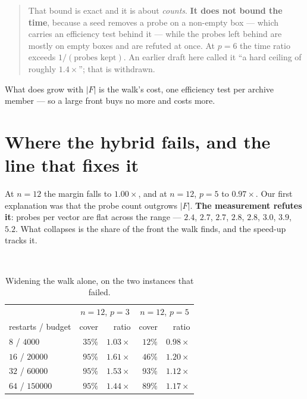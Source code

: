 \documentclass[11pt,a4paper]{article}
\begin{document}
\begin{quote}
That bound is exact and it is about \emph{counts}.  \textbf{It does not bound
the time}, because a seed removes a probe on a non-empty box --- which carries
an efficiency test behind it --- while the probes left behind are mostly on
empty boxes and are refuted at once.  At $p=6$ the time ratio exceeds
$1/(\text{probes kept})$.  An earlier draft here called it ``a hard ceiling of
roughly $1.4\times$''; that is withdrawn.
\end{quote}

\noindent
What does grow with $|F|$ is the walk's cost, one efficiency test per archive
member --- so a large front buys no more and costs more.

\section{Where the hybrid fails, and the line that fixes it}

At $n = 12$ the margin falls to $1.00\times$, and at $n=12$, $p=5$ to
$0.97\times$.  Our first explanation was that the probe count outgrows $|F|$.
\textbf{The measurement refutes it}: probes per vector are flat across the
range --- $2.4$, $2.7$, $2.7$, $2.8$, $2.8$, $3.0$, $3.9$, $5.2$.  What
collapses is the share of the front the walk finds, and the speed-up tracks it.

\begin{center}
\\[2pt]
\end{center}

\begin{table}[h]
\centering
\caption{Widening the walk alone, on the two instances that failed.}
\begin{tabular}{lrrrr}
\toprule
 & \multicolumn{2}{c}{$n=12$, $p=3$} & \multicolumn{2}{c}{$n=12$, $p=5$} \\
restarts / budget & cover & ratio & cover & ratio \\
\midrule
$8$ / $4000$    & $35\%$ & $1.03\times$ & $12\%$ & $0.98\times$ \\
$16$ / $20000$  & $95\%$ & $\mathbf{1.61\times}$ & $46\%$ & $\mathbf{1.20\times}$ \\
$32$ / $60000$  & $95\%$ & $1.53\times$ & $93\%$ & $1.12\times$ \\
$64$ / $150000$ & $95\%$ & $1.44\times$ & $89\%$ & $1.17\times$ \\
\bottomrule
\end{tabular}
\end{table}
\end{document}
